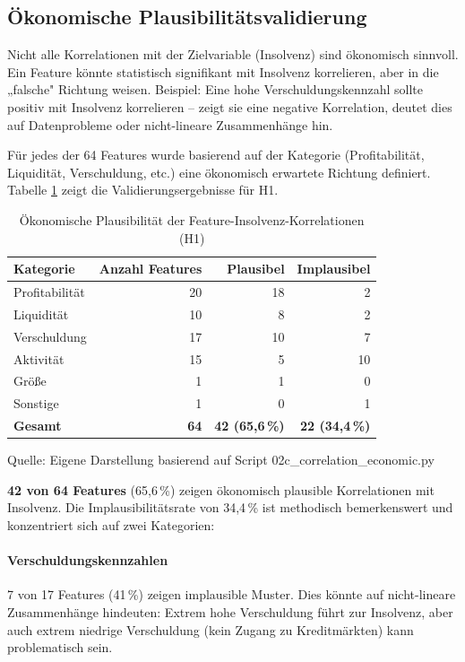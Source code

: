 \subsection{Ökonomische Plausibilitätsvalidierung}

Nicht alle Korrelationen mit der Zielvariable (Insolvenz) sind ökonomisch sinnvoll. Ein Feature könnte statistisch signifikant mit Insolvenz korrelieren, aber in die „falsche" Richtung weisen. Beispiel: Eine hohe Verschuldungskennzahl sollte positiv mit Insolvenz korrelieren – zeigt sie eine negative Korrelation, deutet dies auf Datenprobleme oder nicht-lineare Zusammenhänge hin.

Für jedes der 64 Features wurde basierend auf der Kategorie (Profitabilität, Liquidität, Verschuldung, etc.) eine ökonomisch erwartete Richtung definiert. Tabelle \ref{tab:economic_plausibility} zeigt die Validierungsergebnisse für H1.

\begin{table}[htbp]
\centering
\caption{Ökonomische Plausibilität der Feature-Insolvenz-Korrelationen (H1)}
\label{tab:economic_plausibility}
\begin{tabular}{lrrr}
\toprule
\textbf{Kategorie} & \textbf{Anzahl Features} & \textbf{Plausibel} & \textbf{Implausibel} \\
\midrule
Profitabilität & 20 & 18 & 2 \\
Liquidität & 10 & 8 & 2 \\
Verschuldung & 17 & 10 & 7 \\
Aktivität & 15 & 5 & 10 \\
Größe & 1 & 1 & 0 \\
Sonstige & 1 & 0 & 1 \\
\midrule
\textbf{Gesamt} & \textbf{64} & \textbf{42 (65{,}6\,\%)} & \textbf{22 (34{,}4\,\%)} \\
\bottomrule
\end{tabular}
\par\smallskip
{\footnotesize Quelle: Eigene Darstellung basierend auf Script 02c\_correlation\_economic.py}
\end{table}

\textbf{42 von 64 Features} (65,6\,\%) zeigen ökonomisch plausible Korrelationen mit Insolvenz. Die Implausibilitätsrate von 34,4\,\% ist methodisch bemerkenswert und konzentriert sich auf zwei Kategorien:

\paragraph{Verschuldungskennzahlen} 7 von 17 Features (41\,\%) zeigen implausible Muster. Dies könnte auf nicht-lineare Zusammenhänge hindeuten: Extrem hohe Verschuldung führt zur Insolvenz, aber auch extrem niedrige Verschuldung (kein Zugang zu Kreditmärkten) kann problematisch sein.

